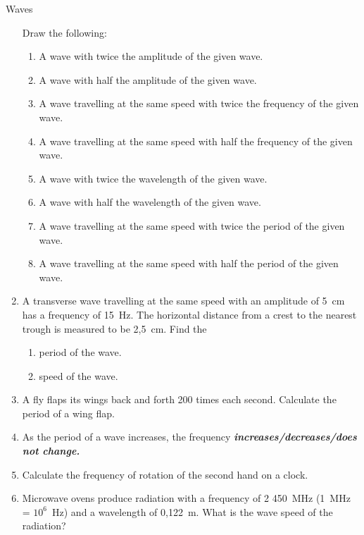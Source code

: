 \begin{definition}
\begin{exercises}{ Waves }
\begin{enumerate}[noitemsep, label=\textbf{\arabic*}. ]
\begin{figure}[H]
 \end{figure}       
Draw the following:
\label{m38806*id320905}\begin{enumerate}[noitemsep, label=\textbf{\alph*}. ] 
            \label{m38806*uid39}\item A wave with twice the amplitude of the given wave.
\label{m38806*uid40}\item A wave with half the amplitude of the given wave.
\label{m38806*uid41}\item A wave travelling at the same speed with twice the frequency of the given wave.
\label{m38806*uid42}\item A wave travelling at the same speed with half the frequency of the given wave.
\label{m38806*uid43}\item A wave with twice the wavelength of the given wave.
\label{m38806*uid44}\item A wave with half the wavelength of the given wave.
\label{m38806*uid45}\item A wave travelling at the same speed with twice the period of the given wave.
\label{m38806*uid46}\item A wave travelling at the same speed with half the period of the given wave.
\end{enumerate}
                \label{m38806*uid47}\item A transverse wave travelling at the same speed with an amplitude of 5~cm has a frequency of 15~Hz. The horizontal distance from a crest to the nearest trough is measured to be 2,5~cm. Find the
\label{m38806*id321026}\begin{enumerate}[noitemsep, label=\textbf{\alph*}. ] 
            \label{m38806*uid48}\item period of the wave.
\label{m38806*uid49}\item speed of the wave.
\end{enumerate}
                \label{m38806*uid50}\item A fly flaps its wings back and forth 200 times each second. Calculate the period of a wing flap.\newline
\label{m38806*uid51}\item As the period of a wave increases, the frequency 
\textsl{\textbf{increases/decreases/does not change.}}\newline
\label{m38806*uid52}\item Calculate the frequency of rotation of the second hand on a clock.\newline
\label{m38806*uid53}\item Microwave ovens produce radiation with a frequency of 2 450~MHz (1~MHz = ${10}^{6}$~Hz) and a wavelength of 0,122~m. What is the wave speed of the radiation?\newline

\end{enumerate}
\end{exercises}
\end{definition}
